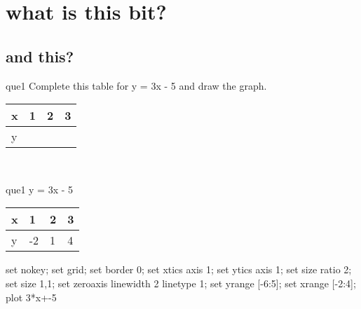 \documentclass[13.5pt, varwidth=true]{beamer}
\begin{document}
\date{}

\section[Graphs]{what is this bit?}
\subsection[title]{and this?}

\begin{frame}[shrink=19,fragile]
	\begin{beamercolorbox}[rounded=true, left, shadow=true,wd=14.8cm]{que1}
		 Complete this table for y = 3x - 5 and draw the graph. \\[0.3cm] \renewcommand{\arraystretch}{1.2}\begin{tabular}{|C|C|C|C|} \hline x & 1 & 2 & 3 \\ \hline y & & & \\ \hline \end{tabular}\\[0.3cm]
	\end{beamercolorbox}
\end{frame}
\begin{frame}[shrink=19,fragile]
	\begin{beamercolorbox}[rounded=true, left, shadow=true,wd=14.8cm]{que1}
		y = 3x - 5\renewcommand{\arraystretch}{1.2}\begin{tabular}{|C|C|C|C|} \hline x & 1 & 2 & 3 \\ \hline y & -2 & 1 & 4\\ \hline \end{tabular}\begin{gnuplot}[terminal=pdf] set nokey; set grid; set border 0; set xtics axis 1; set ytics axis 1; set size ratio 2; set size 1,1; set zeroaxis linewidth 2 linetype 1; set yrange [-6:5]; set xrange [-2:4]; plot 3*x+-5 \end{gnuplot}
	\end{beamercolorbox}
\end{frame}
\end{document}
